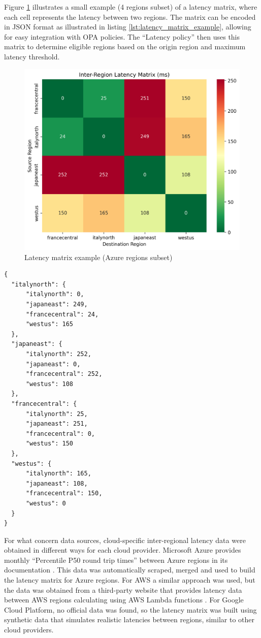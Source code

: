Figure \ref{fig:latency_matrix} illustrates a small example (4 regions subset) of a latency matrix, where each cell represents the latency between two regions. The matrix can be encoded in JSON format as illustrated in listing \ref{lst:latency_matrix_example}, allowing for easy integration with OPA policies. The ``Latency policy'' then uses this matrix to determine eligible regions based on the origin region and maximum latency threshold.

\begin{figure}[t]
  \centering
  \includegraphics[width=0.575\linewidth]{images/latency_heatmap.png}
  \caption{Latency matrix example (Azure regions subset)}
  \label{fig:latency_matrix}
\end{figure}

\lstset{style=jsonstyle}
\begin{lstlisting}[caption={Latancy matrix example encoded in JSON format}, label={lst:latency_matrix_example}, float=t]
{
  "italynorth": {
      "italynorth": 0,
      "japaneast": 249,
      "francecentral": 24,
      "westus": 165
  },
  "japaneast": {
      "italynorth": 252,
      "japaneast": 0,
      "francecentral": 252,
      "westus": 108
  },
  "francecentral": {
      "italynorth": 25,
      "japaneast": 251,
      "francecentral": 0,
      "westus": 150
  },
  "westus": {
      "italynorth": 165,
      "japaneast": 108,
      "francecentral": 150,
      "westus": 0
  }
}

\end{lstlisting}

For what concern data sources, cloud-specific inter-regional latency data were obtained in different ways for each cloud provider.
Microsoft Azure provides monthly ``Percentile P50 round trip times'' between Azure regions in its documentation \cite{azure_network_latency}. 
This data was automatically scraped, merged and used to build the latency matrix for Azure regions.
For AWS a similar approach was used, but the data was obtained from a third-party website that provides latency data between AWS regions calculating using AWS Lambda functions \cite{cloudping}.
For Google Cloud Platform, no official data was found, so the latency matrix was built using synthetic data that simulates realistic latencies between regions, similar to other cloud providers.

